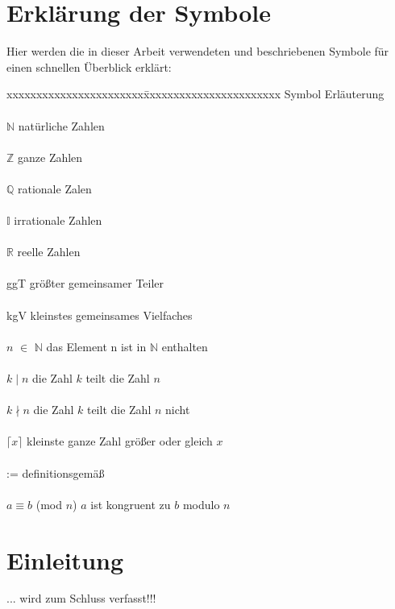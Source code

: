 \documentclass[german,12pt,a4paper]{article}
\begin{document}
\section*{Erklärung der Symbole}
Hier werden die in dieser Arbeit verwendeten und beschriebenen Symbole für einen schnellen Überblick erklärt:\\
\begin{tabbing}
xxxxxxxxxxxxxxxxxxxxxxx\=xxxxxxxxxxxxxxxxxxxxxxx\kill
\large Symbol             \> \large Erläuterung\\
\\$\mathbb{N}$            \> natürliche Zahlen\\
\\$\mathbb{Z}$            \> ganze Zahlen\\
\\$\mathbb{Q}$            \> rationale Zalen\\
\\$\mathbb{I}$            \> irrationale Zahlen\\
\\$\mathbb{R}$            \> reelle Zahlen\\
\\ggT                     \> größter gemeinsamer Teiler\\
\\kgV                     \> kleinstes gemeinsames Vielfaches\\
\\$n$ $\in$ $\mathbb{N}$  \> das Element n ist in $\mathbb{N}$ enthalten\\
\\$k \mid n$              \> die Zahl $k$ teilt die Zahl $n$\\
\\$k \nmid n$             \> die Zahl $k$ teilt die Zahl $n$ nicht\\
\\$\lceil{x}\rceil$       \> kleinste ganze Zahl größer oder gleich $x$\\
\\:=                      \> definitionsgemäß\\
\\$a\equiv b$ (mod $n$)   \> $a$ ist kongruent zu $b$ modulo $n$

\end{tabbing}
\newpage

\section*{Einleitung}
... wird zum Schluss verfasst!!!\newpage
\end{document}
